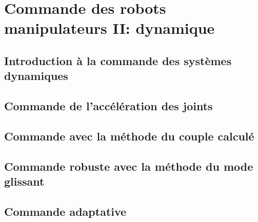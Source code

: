 \chapter{Commande des robots manipulateurs II: dynamique}


\section{Introduction à la commande des systèmes dynamiques}

\section{Commande de l'accélération des joints}

\section{Commande avec la méthode du couple calculé}

\section{Commande robuste avec la méthode du mode glissant}

\section{Commande adaptative}